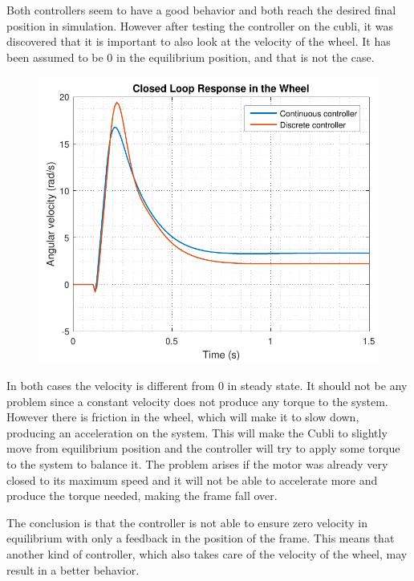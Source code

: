 Both controllers seem to have a good behavior and both reach the desired final position in simulation. However after testing the controller on the cubli, it was discovered that it is important to also look at the velocity of the wheel. It has been assumed to be 0 in the equilibrium position, and that is not the case.
%
\begin{figure}[H]\vspace{-4mm}
	\centering
	\includegraphics[scale=.53]{figures/wheelComp}
   \label{fig:discreteVsContinuousWheel}
\end{figure}\vspace{-5mm}

In both cases the velocity is different from 0 in steady state. It should not be any problem since a constant velocity does not produce any torque 
to the system. However there is friction in the wheel, which will make it to slow down, producing an acceleration on the system. This will make the Cubli to slightly move from equilibrium position and the controller will try to apply some torque to the system to balance it. The problem arises if the motor was already very closed to its maximum speed and it will not be able to accelerate more and produce the torque needed, making the frame fall over.

The conclusion is that the controller is not able to ensure zero velocity in equilibrium with only a feedback in the position of the frame. This means that another kind of controller, which also takes care of the velocity of the wheel, may result in a better behavior.

